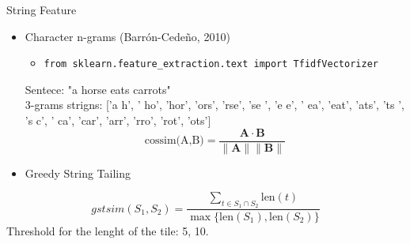 \begin{frame}{String Feature}

    \begin{itemize}
        \item Character n-grams (Barrón-Cedeño, 2010)
        \vspace{0.2cm}
        \begin{itemize}
            \item \texttt{from sklearn.feature\_extraction.text import TfidfVectorizer} 
        \end{itemize}
        \vspace{0.2cm} 
        Sentece: "a horse eats carrots" \\ \vspace{0.2cm}
        3-grams strigns: ['a h', ' ho', 'hor', 'ors', 'rse', 'se ', 'e e', ' ea', 'eat', 'ats', 'ts ', 's c', ' ca', 'car', 'arr', 'rro', 'rot', 'ots']
        \[ 
            \text{cossim(A,B)} = \frac{\mathbf{A} \cdot \mathbf{B}}{\|\mathbf{A}\| \|\mathbf{B}\|}
             \]
    \end{itemize}

    \begin{itemize}
        \item Greedy String Tailing
    \end{itemize}
    \[
gstsim(S_1, S_2) = \frac{\sum_{t \in S_1 \cap S_2} \text{len}(t)}{\max \{ \text{len}(S_1), \text{len}(S_2) \}}
\]
        Threshold for the lenght of the tile: 5, 10. \\ \vspace{0.1cm}
\end{frame}
